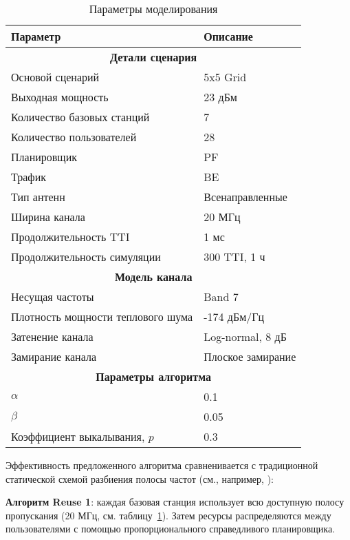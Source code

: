 \begin{table}
\centering
    \caption{Параметры моделирования}
    \begin{tabular}{|l l|} 
    \hline
    \textbf{Параметр} & \textbf{Описание} \\
    \hline
    \multicolumn{2}{|c|}{\textbf{Детали сценария}} \\
    \hline
    Основой сценарий & 5x5 Grid~\cite{R4-092042} \\
    \hline
    Выходная мощность & 23 дБм \\
    \hline
    Количество базовых станций & 7 \\
    \hline
    Количество пользователей & 28 \\
    \hline
    Планировщик & PF \\
    \hline
    Трафик & BE \\
    \hline
    Тип антенн & Всенаправленные \\
    \hline
    Ширина канала & 20 МГц \\
    \hline
    Продолжительность TTI  & 1 мс \\
    \hline
    Продолжительность симуляции & 300 TTI, 1 ч \\
    \hline
    \multicolumn{2}{|c|}{\textbf{Модель канала}} \\
    \hline
    Несущая частоты & Band 7 \\
    \hline
    Плотность мощности теплового шума  & -174 дБм/Гц \\
    \hline
    Затенение канала & Log-normal, 8 дБ \\
    \hline
    Замирание канала & Плоское замирание \\
    \hline
    \multicolumn{2}{|c|}{\textbf{Параметры алгоритма}} \\
    \hline
    $\alpha$ & 0.1 \\
    \hline
    $\beta$ & 0.05 \\
    \hline
    Коэффициент выкалывания, $p$ & 0.3 \\
    \hline
    \end{tabular}
    \label{table:simulation_parameters}
\end{table}

Эффективность предложенного алгоритма сравненивается с традиционной статической схемой разбиения полосы частот (см., например, \cite{4907410}): 

\textbf{Алгоритм Reuse 1}: каждая базовая станция использует всю доступную полосу пропускания (20 МГц, см. таблицу~\ref{table:simulation_parameters}). Затем ресурсы распределяются между пользователями с помощью пропорционального справедливого планировщика.

